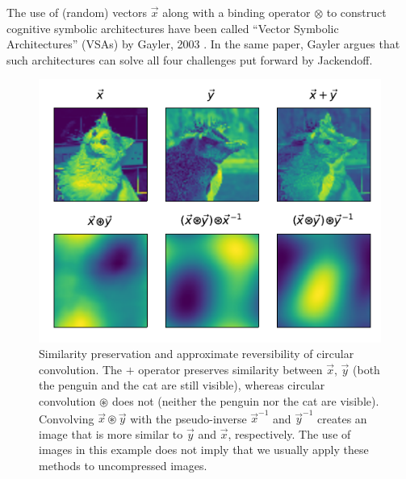 \documentclass[10pt,letterpaper,oneside]{article}
\begin{document}
The use of (random) vectors $\vec x$ along with a binding operator $\otimes$ to construct cognitive symbolic architectures have been called \enquote{Vector Symbolic Architectures} (VSAs) by Gayler, 2003 \cite{gayler2003vector}. In the same paper, Gayler argues that such architectures can solve all four challenges put forward by Jackendoff.

\begin{figure}
	\centering
	\includegraphics{media/cconv_sim.pdf}
	\caption{Similarity preservation and approximate reversibility of circular convolution. The $+$ operator preserves similarity between $\vec x$, $\vec y$ (both the penguin and the cat are still visible), whereas circular convolution $\circledast$ does not (neither the penguin nor the cat are visible). Convolving $\vec x \circledast \vec y$ with the pseudo-inverse $\vec x^{-1}$ and $\vec y^{-1}$ creates an image that is more similar to $\vec y$ and $\vec x$, respectively. The use of images in this example does not imply that we usually apply these methods to uncompressed images. }
	\label{fig:cconv_sim}
\end{figure}
\end{document}
